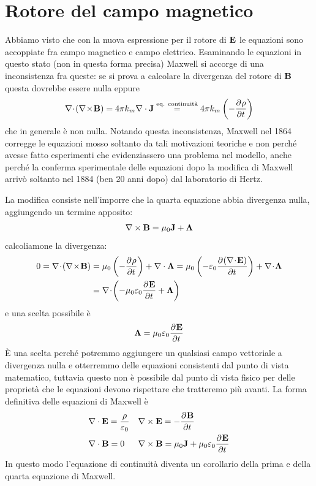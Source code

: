 \section{Rotore del campo magnetico}
Abbiamo visto che con la nuova espressione per il rotore di $ \mathbf{ E } $ le equazioni sono accoppiate fra campo magnetico e campo elettrico. 
Esaminando le equazioni in questo stato (non in questa forma precisa) Maxwell si accorge di una inconsistenza fra queste: se si prova a calcolare la 
divergenza del rotore di $ \mathbf{ B } $ questa dovrebbe essere nulla eppure
\begin{align}
  \nabla\! \cdot\! \left( \nabla\! \times\!\mathbf{ B } \right) = 4\pi k_m \nabla \cdot \mathbf{ J } 
  \overset{\text{eq. continuità}}{=} 4\pi k_m \left(- \frac{\partial^{} {\rho}}{\partial {t}^{}} \right)
\end{align}
che in generale è non nulla. Notando questa inconsistenza, Maxwell nel 1864 corregge le equazioni mosso soltanto da tali motivazioni teoriche  
e non perché avesse fatto esperimenti che evidenziassero una problema nel modello, anche perché la conferma sperimentale delle equazioni dopo la 
modifica di Maxwell arrivò soltanto nel 1884 (ben 20 anni dopo) dal laboratorio di Hertz.

La modifica consiste nell'imporre che la quarta equazione abbia divergenza nulla, aggiungendo un termine apposito:
\begin{align}
  \mathbf{\nabla}\times\mathbf{ B } = \mu_0 \mathbf{ J } + \mathbf{ \Lambda }
\end{align}
calcoliamone la divergenza:
\begin{align}
  0 = \nabla\! \cdot\! \left( \nabla\! \times\!\v{ B } \right) &= \mu_0 \left( - \der{\rho}{t} \right) + \nabla \cdot \v{ \Lambda } 
  = \mu_0 \left( - \varepsilon_0 \der{\left( \nabla \! \cdot \!\v{ E } \right)}{t} \right) + \nabla\!\cdot\!\v{ \Lambda }
  \\
  &= \nabla \! \cdot \! \left( - \mu_0\varepsilon_0 \der{\v{ E }}{t} + \v{ \Lambda } \right)
\end{align}
e una scelta possibile è
\begin{equation}
  \mathbf{ \Lambda } = \mu_0 \varepsilon_0 \frac{\partial^{} {\mathbf{ E }}}{\partial {t}^{}}
\end{equation}
È una scelta perché potremmo aggiungere un qualsiasi campo vettoriale a divergenza nulla e otterremmo delle equazioni consistenti dal punto di 
vista matematico, tuttavia questo non è possibile dal punto di vista fisico per delle proprietà che le equazioni devono rispettare che tratteremo 
più avanti. La forma definitiva delle equazioni di Maxwell è
\begin{align} \label{equazioni di Maxwell dinamiche}
  &\nabla\cdot\mathbf{ E } = \frac{\rho}{\varepsilon_0} &
  &\mathbf{\nabla}\times\mathbf{ E } = - \frac{\partial^{} {\mathbf{ B }}}{\partial {t}^{}} \\
  &\nabla\cdot\mathbf{ B } = 0 &
  &\mathbf{\nabla}\times\mathbf{ B } = \mu_0 \mathbf{ J } + \mu_0 \varepsilon_0 \frac{\partial^{} {\mathbf{ E }}}{\partial {t}^{}}
\end{align}
In questo modo l'equazione di continuità diventa un corollario della prima e della quarta equazione di Maxwell.
